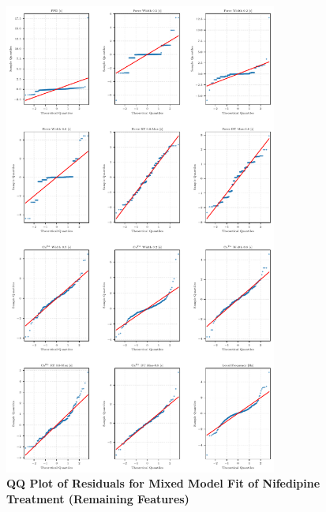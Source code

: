 \documentclass{report}
\begin{document}
    \begin{figure}[H]
        \centering
        \includegraphics[width=0.8\textwidth, keepaspectratio]{plots/chapter_5/nifedipine/qq_mixed_subset_12.pdf}
        \caption[QQ Plot of Residuals for Mixed Model Fit of Nifedipine Treatment (Remaining Features)]{\textbf{QQ Plot of Residuals for Mixed Model Fit of Nifedipine Treatment (Remaining Features)}}
        \label{fig:nifedipine-remaining-qq}
    \end{figure}
\end{document}
